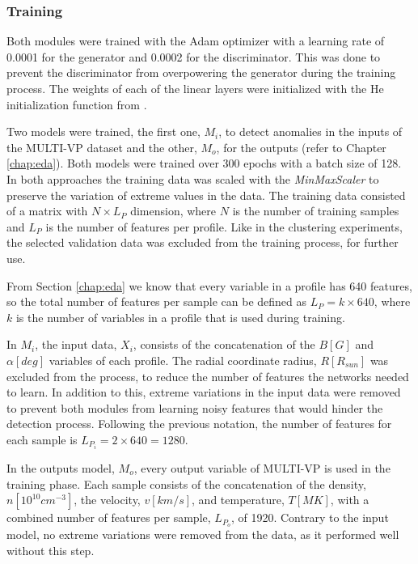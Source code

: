 \subsubsection*{Training}
Both modules were trained with the Adam optimizer with a learning rate of 0.0001 for the generator and 0.0002 for the discriminator. This was done to prevent the discriminator from overpowering the generator during the training process. The weights of each of the linear layers were initialized with the He initialization function from \cite{He.Zhang.ea_DelvingDeepRectifiers_2015}.

Two models were trained, the first one, $M_i$, to detect anomalies in the inputs of the MULTI-VP dataset and the other, $M_o$, for the outputs (refer to Chapter \ref{chap:eda}). Both models were trained over 300 epochs with a batch size of 128. In both approaches the training data was scaled with the \textit{MinMaxScaler} to preserve the variation of extreme values in the data. The training data consisted of a matrix with $N\times L_P$ dimension, where $N$ is the number of training samples and $L_P$ is the number of features per profile. Like in the clustering experiments, the selected validation data was excluded from the training process, for further use. 

From Section \ref{chap:eda} we know that every variable in a profile has 640 features, so the total number of features per sample can be defined as $L_P = k\times 640$, where $k$ is the number of variables in a profile that is used during training. 

In $M_i$, the input data, $X_i$, consists of the concatenation of the $B [G]$ and $\alpha [deg]$ variables of each profile. The radial coordinate radius, $R [R_{sun}]$ was excluded from the process, to reduce the number of features the networks needed to learn. In addition to this, extreme variations in the input data were removed to prevent both modules from learning noisy features that would hinder the detection process. Following the previous notation, the number of features for each sample is $L_{P_i} = 2\times 640 = 1280$.

In the outputs model, $M_o$, every output variable of MULTI-VP is used in the training phase. Each sample consists of the concatenation of the density, $n [10^{10}cm^{-3}]$,  the velocity, $v [km/s]$, and temperature, $T [MK]$, with a combined number of features per sample, $L_{P_o}$, of 1920. Contrary to the input model, no extreme variations were removed from the data, as it performed well without this step.

